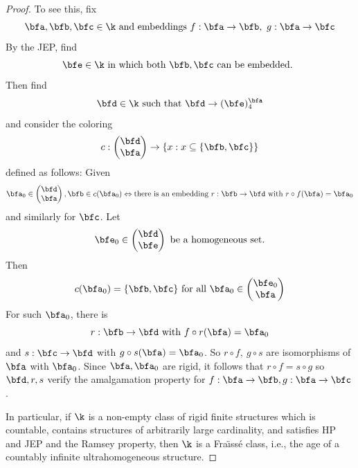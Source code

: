 \begin{proof}
    To see this, fix $$\bfa ,\bfb ,\bfc\in\k
        \text{ and embeddings } f:\bfa\rightarrow\bfb ,\ g:\bfa\rightarrow \bfc$$  By the
    JEP, find $$\bfe\in\k \text{ in which both } \bfb ,\bfc \text{  can be embedded. }$$
    Then find $$\bfd\in\k \text{ such that } \bfd\rightarrow (\bfe )^\bfa_4$$ and consider
    the coloring $$c:\begin{pmatrix}\bfd\\ \bfa\end{pmatrix}\rightarrow\{x:
        x\subseteq\{\bfb ,\bfc\}\}$$ defined as follows:  Given $$\bfa_0\in\begin{pmatrix}
            \bfd \\ \bfa\end{pmatrix},\bfb\in c(\bfa_0)\Leftrightarrow \text{there is an
            embedding } r:\bfb\rightarrow\bfd \text{ with } r\circ f(\bfa )=\bfa_0$$ and
    similarly for $\bfc$.  Let $$\bfe_0\in\begin{pmatrix}\bfd \\ \bfe
        \end{pmatrix} \text{ be a homogeneous set.}$$   Then $$c(\bfa_0)=\{\bfb ,\bfc\} \text{ for
            all } \bfa_0\in\begin{pmatrix}\bfe_0\\ \bfa\end{pmatrix}$$  For such $\bfa_0$,
    there is $$r:\bfb\rightarrow\bfd  \text{ with } f\circ r(\bfa )=\bfa_0$$ and $s:
        \bfc\rightarrow\bfd$ with $g\circ s(\bfa )=\bfa_0$.  So $r\circ f,\ g\circ s$
    are isomorphisms of $\bfa$ with $\bfa_0$.  Since $\bfa ,\bfa_0$ are rigid,
    it follows that $r\circ f=s\circ g$ so $\bfd ,r,s$ verify the amalgamation
    property for $f:\bfa\rightarrow\bfb ,g:\bfa\rightarrow \bfc$.

    In particular, if $\k$ is a non-empty class of rigid finite structures which is countable, contains structures of arbitrarily
    large cardinality, and satisfies HP and JEP and the Ramsey property, then
    $\k$ is a Fra\"{\i}ss\'{e} class, i.e., the age of a countably infinite
    ultrahomogeneous structure.
\end{proof}

